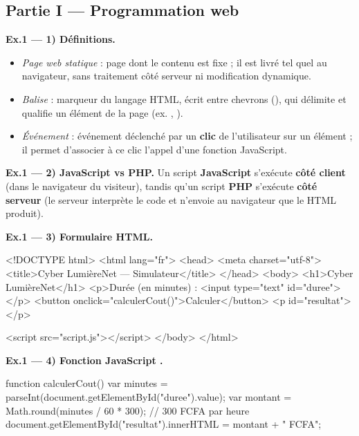 
\subsection*{Partie I — Programmation web}

\textbf{Ex.1 — 1) Définitions.}
\begin{itemize}
\item \emph{Page web statique} : page dont le contenu est fixe ; il est livré tel
quel au navigateur, sans traitement côté serveur ni modification dynamique.
\item \emph{Balise} : marqueur du langage HTML, écrit entre chevrons
(), qui délimite et qualifie un élément de la page (ex. ,
).
\item \emph{Événement } : événement déclenché par un \textbf{clic}
de l'utilisateur sur un élément ; il permet d'associer à ce clic l'appel d'une
fonction JavaScript.
\end{itemize}

\textbf{Ex.1 — 2) JavaScript vs PHP.} Un script \textbf{JavaScript} s'exécute
\textbf{côté client} (dans le navigateur du visiteur), tandis qu'un script
\textbf{PHP} s'exécute \textbf{côté serveur} (le serveur interprète le code et
n'envoie au navigateur que le HTML produit).

\textbf{Ex.1 — 3) Formulaire HTML.}

\begin{codehtml}
<!DOCTYPE html>
<html lang="fr">
<head>
  <meta charset="utf-8">
  <title>Cyber LumièreNet — Simulateur</title>
</head>
<body>
  <h1>Cyber LumièreNet</h1>
  <p>Durée (en minutes) : <input type="text" id="duree"></p>
  <button onclick="calculerCout()">Calculer</button>
  <p id="resultat"></p>

  <script src="script.js"></script>
</body>
</html>
\end{codehtml}

\textbf{Ex.1 — 4) Fonction JavaScript .}

\begin{codejs}
function calculerCout() {
  var minutes = parseInt(document.getElementById("duree").value);
  var montant = Math.round(minutes / 60 * 300);   // 300 FCFA par heure
  document.getElementById("resultat").innerHTML = montant + " FCFA";
}
\end{codejs}

